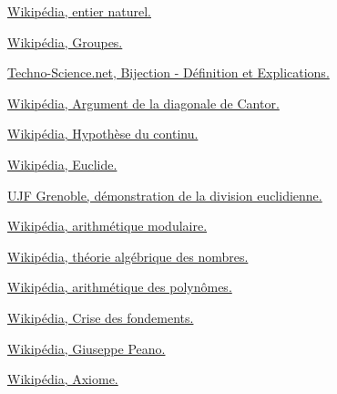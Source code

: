 \documentclass[12pt]{article}
\begin{document}
\begin{enumerate}[label=\text{[}\arabic*\text{]}]

\item \href{https://fr.wikipedia.org/wiki/Entier_naturel}{Wikipédia, entier naturel.} \label{itm:entnat}

\item \href{https://fr.wikipedia.org/wiki/Groupe_(mathématiques)}{Wikipédia, Groupes.} \label{itm:Groupe}

\item \href{https://www.techno-science.net/definition/6433.html}{Techno-Science.net, Bijection - Définition et Explications.} \label{itm:Bijec}

\item \href{https://fr.wikipedia.org/wiki/Argument_de_la_diagonale_de_Cantor}{Wikipédia, Argument de la diagonale de Cantor.} \label{itm;DiaCan}

\item \href{https://fr.wikipedia.org/wiki/Hypothèse_du_continu}{Wikipédia, Hypothèse du continu.} \label{itm:HyDuCo}

\item \href{https://fr.wikipedia.org/wiki/Euclide}{Wikipédia, Euclide.} \label{itm:Euclide}

\item \href{https://membres-ljk.imag.fr/Bernard.Ycart/mel/ar/node4.html}{UJF Grenoble, démonstration de la division euclidienne.} \label{itm:DivEuc}

\item \href{https://fr.wikipedia.org/wiki/Arithmétique_modulaire}{Wikipédia, arithmétique modulaire.} \label{itm:AriMod}

\item \href{https://fr.wikipedia.org/wiki/Théorie_algébrique_des_nombres}{Wikipédia, théorie algébrique des nombres.} \label{itm:AriAlg}

\item \href{https://fr.wikipedia.org/wiki/Arithmétique_des_polynômes}{Wikipédia, arithmétique des polynômes.} \label{itm:AriPol}

\item \href{https://fr.wikipedia.org/wiki/Crise_des_fondements}{Wikipédia, Crise des fondements.} \label{itm:CriFon}

\item \href{https://fr.wikipedia.org/wiki/Giuseppe_Peano}{Wikipédia, Giuseppe Peano.} \label{itm:Peano}

\item \href{https://fr.wikipedia.org/wiki/Axiome}{Wikipédia, Axiome.} \label{itm:Axiome}


\end{enumerate}
\end{document}
